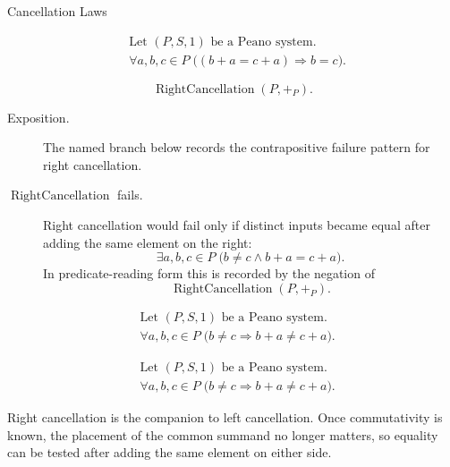 \begin{topicbox}{Cancellation Laws}
\begin{remark*}
\[
\begin{aligned}
&\text{Let } (P,S,1) \text{ be a Peano system.}\\
&\forall a,b,c \in P\;\bigl((b+a=c+a) \Longrightarrow b=c\bigr).
\end{aligned}
\]
\end{remark*}

\begin{remark*}
\[
\operatorname{RightCancellation}(P,+_P).
\]
\end{remark*}



\begin{remark*}
\begin{description}
  \item[Exposition.] The named branch below records the contrapositive failure
  pattern for right cancellation.
  \item[\(\operatorname{RightCancellation}\) fails.] Right cancellation would
  fail only if distinct inputs became equal after adding the same element on the
  right:
  \[
  \exists a,b,c \in P\;\bigl(b \neq c \land b+a=c+a\bigr).
  \]
  In predicate-reading form this is recorded by the negation of
  \[
  \operatorname{RightCancellation}(P,+_P).
  \]
\end{description}
\end{remark*}

\begin{remark*}
\[
\begin{aligned}
&\text{Let } (P,S,1) \text{ be a Peano system.}\\
&\forall a,b,c \in P\;\bigl(b \neq c \Longrightarrow b+a \neq c+a\bigr).
\end{aligned}
\]
\end{remark*}

\begin{remark*}
\[
\begin{aligned}
&\text{Let } (P,S,1) \text{ be a Peano system.}\\
&\forall a,b,c \in P\;\bigl(b \neq c \Longrightarrow b+a \neq c+a\bigr).
\end{aligned}
\]
\end{remark*}

\begin{remark*}[Interpretation]
Right cancellation is the companion to left cancellation. Once commutativity
is known, the placement of the common summand no longer matters, so equality
can be tested after adding the same element on either side.
\end{remark*}


\end{topicbox}
